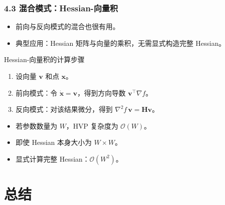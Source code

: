 \documentclass[t,aspectratio=169]{beamer} %
\begin{document}
\begin{frame}
    \frametitle{4.3 混合模式：Hessian-向量积}
    \begin{itemize}
        \item 前向与反向模式的\alert{混合}也很有用。
        \item 典型应用：\alert{Hessian 矩阵与向量的乘积}，无需显式构造完整 Hessian。
    \end{itemize}
    \begin{block}{Hessian-向量积的计算步骤}
        \begin{enumerate}
            \item 设向量 $\mathbf{v}$ 和点 $\mathbf{x}$。
            \item 前向模式：令 $\dot{\mathbf{x}} = \mathbf{v}$，得到方向导数 $\mathbf{v}^\top \nabla f$。
            \item 反向模式：对该结果微分，得到 $\nabla^2 f \, \mathbf{v} = \mathbf{H} \mathbf{v}$。
        \end{enumerate}
    \end{block}
    \begin{itemize}
        \item 若参数数量为 $W$，HVP 复杂度为 $\mathcal{O}(W)$。
        \item 即使 Hessian 本身大小为 $W \times W$。
        \item 显式计算完整 Hessian：$\mathcal{O}(W^2)$。
    \end{itemize}
\end{frame}

\section{总结}
\end{document}
